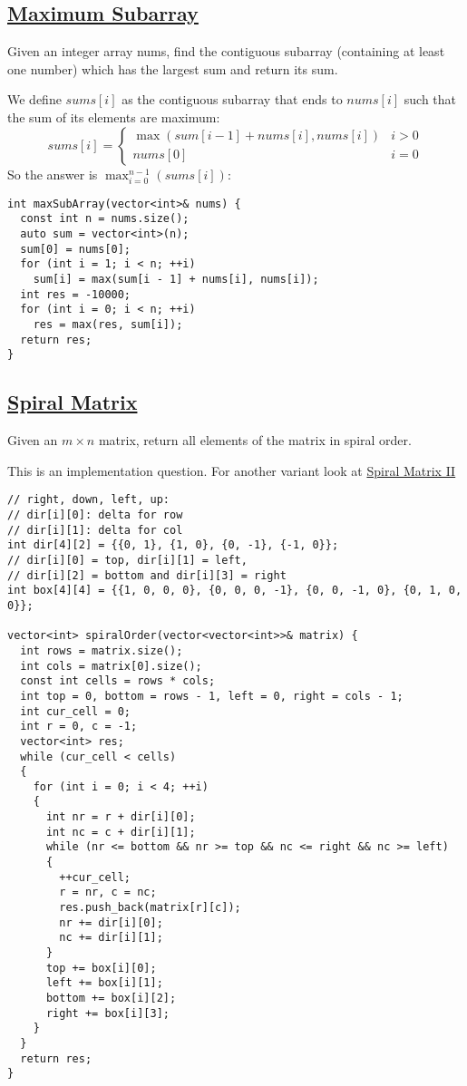 \documentclass{book}
\begin{document}
	\subsection{\href{https://leetcode.com/problems/maximum-subarray/}{Maximum Subarray}}
	Given an integer array nums, find the contiguous subarray (containing at least one number) which has the largest sum and return its sum.
	\par We define $sums[i]$ as the contiguous subarray that ends to $nums[i]$ such that the sum of its elements are maximum:
	\begin{equation*}
		sums[i] = \begin{cases}
			\max(sum[i - 1] + nums[i], nums[i]) & i > 0 \\
			nums[0] & i = 0
		\end{cases}
	\end{equation*}
	So the answer is $\max_{i = 0}^{n - 1}(sums[i])$:
	\begin{lstlisting}
int maxSubArray(vector<int>& nums) {
  const int n = nums.size();
  auto sum = vector<int>(n);
  sum[0] = nums[0];
  for (int i = 1; i < n; ++i)
    sum[i] = max(sum[i - 1] + nums[i], nums[i]);
  int res = -10000;
  for (int i = 0; i < n; ++i)
    res = max(res, sum[i]);
  return res;
}
	\end{lstlisting}
	\subsection{\href{https://leetcode.com/problems/spiral-matrix/}{Spiral Matrix}}
	Given an $m \times n$ matrix, return all elements of the matrix in spiral order.
	\par This is an implementation question. For another variant look at \href{https://leetcode.com/problems/spiral-matrix-ii/submissions/}{Spiral Matrix II}
	\begin{lstlisting}
// right, down, left, up: 
// dir[i][0]: delta for row
// dir[i][1]: delta for col
int dir[4][2] = {{0, 1}, {1, 0}, {0, -1}, {-1, 0}};
// dir[i][0] = top, dir[i][1] = left, 
// dir[i][2] = bottom and dir[i][3] = right
int box[4][4] = {{1, 0, 0, 0}, {0, 0, 0, -1}, {0, 0, -1, 0}, {0, 1, 0, 0}};

vector<int> spiralOrder(vector<vector<int>>& matrix) {
  int rows = matrix.size();
  int cols = matrix[0].size();
  const int cells = rows * cols;
  int top = 0, bottom = rows - 1, left = 0, right = cols - 1;
  int cur_cell = 0;
  int r = 0, c = -1;
  vector<int> res;
  while (cur_cell < cells)
  {
    for (int i = 0; i < 4; ++i)
    {
      int nr = r + dir[i][0];
      int nc = c + dir[i][1];
      while (nr <= bottom && nr >= top && nc <= right && nc >= left)
      {
        ++cur_cell;
        r = nr, c = nc;
        res.push_back(matrix[r][c]);
        nr += dir[i][0];
        nc += dir[i][1];
      }
      top += box[i][0];
      left += box[i][1];
      bottom += box[i][2];
      right += box[i][3];
    }
  }
  return res;
}
	\end{lstlisting}
\end{document}
